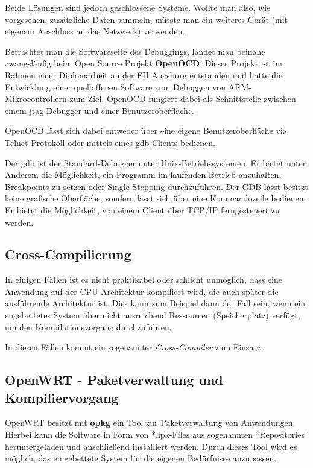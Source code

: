 Beide Lösungen sind jedoch geschlossene Systeme. Wollte man also, wie
vorgesehen, zusätzliche Daten sammeln, müsste man ein weiteres Gerät (mit
eigenem Anschluss an das Netzwerk) verwenden.

Betrachtet man die Softwareseite des Debuggings, landet man beinahe
zwangsläufig beim Open Source Projekt \textbf{OpenOCD}. Dieses Projekt ist im
Rahmen einer Diplomarbeit\cite{OOCD2} an der FH Augsburg entstanden und hatte
die Entwicklung einer quelloffenen Software zum Debuggen von
ARM-Mikrocontrollern zum Ziel. OpenOCD fungiert dabei als Schnittstelle zwischen
einem \gls{jtag}-Debugger und einer Benutzeroberfläche.

OpenOCD lässt sich dabei entweder über eine eigene Benutzeroberfläche via
Telnet-Protokoll oder mittels eines \gls{gdb}-Clients bedienen.
\begin{definition}[GDB]
Der \gls{gdb} ist der Standard-Debugger unter
Unix-Betriebssystemen. Er bietet unter Anderem die Möglichkeit, ein Programm im
laufenden Betrieb anzuhalten, Breakpoints zu setzen oder Single-Stepping
durchzuführen. Der GDB lässt besitzt keine grafische Oberfläche, sondern
lässt sich über eine Kommandozeile bedienen. Er bietet die Möglichkeit, von
einem Client über TCP/IP ferngesteuert zu werden. 
\end{definition}
\subsection{Cross-Compilierung}
In einigen Fällen ist es nicht praktikabel oder schlicht unmöglich, dass eine
Anwendung auf der CPU-Architektur kompiliert wird, die auch später die
ausführende Architektur ist. Dies kann zum Beispiel dann der Fall sein, wenn ein
engebettetes System über nicht ausreichend Ressourcen (Speicherplatz) verfügt,
um den Kompilationsvorgang durchzuführen.

In diesen Fällen kommt ein sogenannter \emph{Cross-Compiler} zum Einsatz.
\subsection{OpenWRT - Paketverwaltung und Kompiliervorgang}
OpenWRT besitzt mit \textbf{opkg} ein Tool zur Paketverwaltung von Anwendungen.
Hierbei kann die Software in Form von *.ipk-Files aus sogenannten "`Repositories"'
heruntergeladen und anschließend installiert werden. Durch dieses Tool wird es
möglich, das eingebettete System für die eigenen Bedürfnisse anzupassen.

